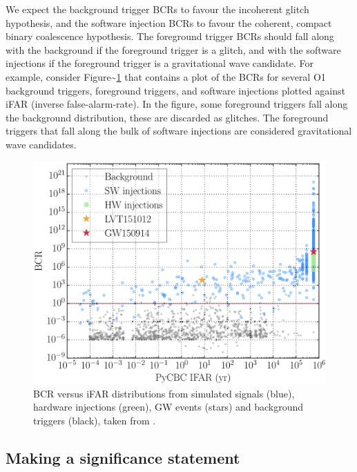 \documentclass[%
 reprint,
 amsmath,amssymb,
 aps,
]{revtex4}
\begin{document}
We expect the background trigger BCRs to favour the incoherent glitch hypothesis, and the software injection BCRs to
favour the coherent, compact binary coalescence hypothesis. The foreground trigger BCRs should fall along with the
background if the foreground trigger is a glitch, and with the software injections if the foreground trigger is a
gravitational wave candidate. For example, consider Figure\textasciitilde\ref{fig:bcrIfar} that contains a plot of the BCRs for
several O1 background triggers, foreground triggers, and software injections plotted against iFAR (inverse
false-alarm-rate). In the figure, some foreground triggers fall along the background distribution, these are discarded
as glitches. The foreground triggers that fall along the bulk of software injections are considered gravitational wave
candidates.



\begin{figure}[!h]

{\centering \includegraphics[width=0.75\linewidth]{images/bcr_ifar} 

}

\caption[BCR vs iFAR for O1]{BCR versus iFAR distributions from simulated signals (blue), hardware injections (green), GW events (stars) and background triggers (black), taken from \citet{bcr_paper}.}\label{fig:bcrIfar}
\end{figure}

\hypertarget{making-a-significance-statement}{%
\subsection{Making a significance statement}\label{making-a-significance-statement}}
\end{document}
